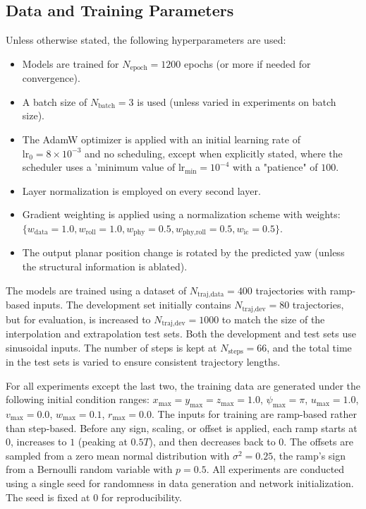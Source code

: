 \subsection{Data and Training Parameters}
\label{subsec:data_training_params}
Unless otherwise stated, the following hyperparameters are used:
\begin{itemize}
    \item Models are trained for $N_{\text{epoch}} = 1200$ epochs (or more if needed for convergence).
    \item A batch size of $N_{\text{batch}} = 3$ is used (unless varied in experiments on batch size).
    \item The AdamW optimizer is applied with an initial learning rate of $\text{lr}_0 = 8\times10^{-3}$ and no scheduling, except when explicitly stated, where the scheduler uses a 'minimum value of $\text{lr}_{\min}=10^{-4}$ with a "patience" of $100$.
    \item Layer normalization is employed on every second layer.
    \item Gradient weighting is applied using a normalization scheme with weights: $\{w_{\text{data}} = 1.0, w_{\text{roll}} = 1.0, w_{\text{phy}} = 0.5, w_{\text{phy,roll}} = 0.5, w_{\text{ic}} = 0.5\}$.
    \item The output planar position change is rotated by the predicted yaw (unless the structural information is ablated).
\end{itemize}

The models are trained using a dataset of $N_{\text{traj,data}} = 400$ trajectories with ramp-based inputs. The development set initially contains $N_{\text{traj,dev}} = 80$ trajectories, but for evaluation, is increased to $N_{\text{traj,dev}} = 1000$ to match the size of the interpolation and extrapolation test sets. Both the development and test sets use sinusoidal inputs. The number of steps is kept at $N_{\text{steps}} = 66$, and the total time in the test sets is varied to ensure consistent trajectory lengths.

For all experiments except the last two, the training data are generated under the following initial condition ranges: $x_{\max} = y_{\max} = z_{\max} = 1.0$, $\psi_{\max} = \pi$, $u_{\max} = 1.0$, $v_{\max} =0.0$, $w_{\max} = 0.1$, $r_{\max} = 0.0$. The inputs for training are ramp-based rather than step-based. Before any sign, scaling, or offset is applied, each ramp starts at $0$, increases to $1$ (peaking at $0.5T$), and then decreases back to $0$. The offsets are sampled from a zero mean normal distribution with $\sigma^2=0.25$, the ramp's sign from a Bernoulli random variable with $p=0.5$. 
All experiments are conducted using a single seed for randomness in data generation and network initialization. The seed is fixed at 0 for reproducibility.


